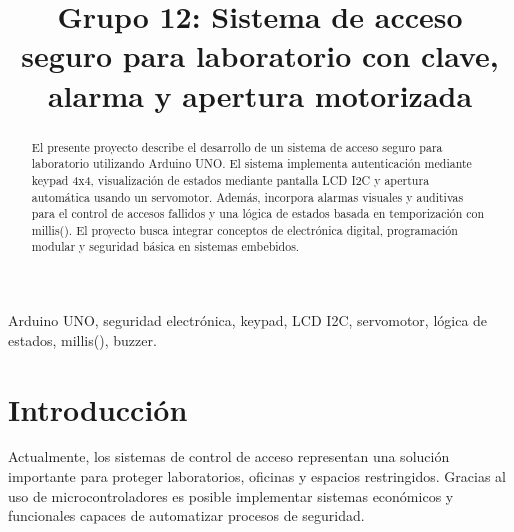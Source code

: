 \documentclass[conference]{IEEEtran}
\begin{document}
\title{Grupo 12: Sistema de acceso seguro para laboratorio con clave, alarma y apertura motorizada}

\author{
    \and
    \and
    \and
}

\maketitle

\begin{abstract}
El presente proyecto describe el desarrollo de un sistema de acceso seguro para laboratorio utilizando 
Arduino UNO. El sistema implementa autenticación mediante keypad 4x4, visualización de estados mediante 
pantalla LCD I2C y apertura automática usando un servomotor. Además, incorpora alarmas visuales y 
auditivas para el control de accesos fallidos y una lógica de estados basada en temporización con 
millis(). El proyecto busca integrar conceptos de electrónica digital, programación modular y 
seguridad básica en sistemas embebidos.
\end{abstract}

\begin{IEEEkeywords}
Arduino UNO, seguridad electrónica, keypad, LCD I2C, servomotor, lógica de estados, millis(), buzzer.
\end{IEEEkeywords}

\section{Introducción}

Actualmente, los sistemas de control de acceso representan una solución importante para proteger 
laboratorios, oficinas y espacios restringidos. Gracias al uso de microcontroladores es posible 
implementar sistemas económicos y funcionales capaces de automatizar procesos de seguridad.
\end{document}
